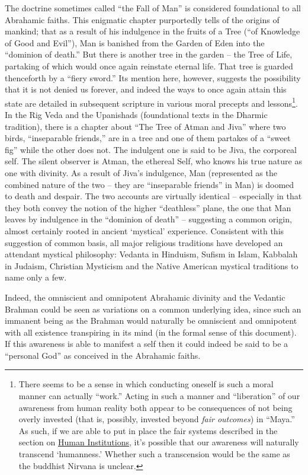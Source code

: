 \documentclass[pra,twocolumn,groupedaddress,10pt]{revtex4}
\theoremstyle{definition}
\begin{document}
The doctrine sometimes called ``the Fall of Man'' is considered foundational to all Abrahamic faiths. This enigmatic chapter purportedly tells of the origins of mankind; that as a result of his indulgence in the fruits of a Tree (``of Knowledge of Good and Evil''), Man is banished from the Garden of Eden into the ``dominion of death.''\cite{genesisfallofman} But there is another tree in the garden -- the Tree of Life, partaking of which would once again reinstate eternal life. That tree is guarded thenceforth by a ``fiery sword.'' Its mention here, however, suggests the possibility that it is not denied us forever, and indeed the ways to once again attain this state are detailed in subsequent scripture in various moral precepts and lessons\footnote{There seems to be a sense in which conducting oneself is such a moral manner can actually ``work.'' Acting in such a manner and ``liberation'' of our awareness from human reality both appear to be consequences of not being overly invested (that is, possibly, invested beyond \textit{fair outcomes}) in ``Maya.'' As such, if we are able to put in place the fair systems described in the section on \hyperref[sec:humins]{Human Institutions}, it's possible that our awareness will naturally transcend `humanness.' Whether such a transcension would be the same as the buddhist Nirvana is unclear.}. In the Rig Veda and the Upanishads (foundational texts in the Dharmic tradition), there is a chapter about ``The Tree of Atman and Jiva''\cite{mundakaupanishad} where two birds, ``inseparable friends,'' are in a tree and one of them partakes of a ``sweet fig'' while the other does not. The indulgent one is said to be Jiva, the corporeal self. The silent observer is Atman, the ethereal Self, who knows his true nature as one with divinity. As a result of Jiva's indulgence, Man (represented as the combined nature of the two -- they are ``inseparable friends'' in Man) is doomed to death and despair. The two accounts are virtually identical -- especially in that they both convey the notion of the higher ``deathless'' plane, the one that Man leaves by indulgence in the ``dominion of death'' -- suggesting a common origin, almost certainly rooted in ancient `mystical' experience. Consistent with this suggestion of common basis, all major religious traditions have developed an attendant mystical philosophy: Vedanta in Hinduism, Sufism in Islam, Kabbalah in Judaism, Christian Mysticism and the Native American mystical traditions to name only a few.

Indeed, the omniscient and omnipotent Abrahamic divinity and the Vedantic Brahman could be seen as variations on a common underlying idea, since such an immanent being as the Brahman would naturally be omniscient and omnipotent with all existence transpiring in its mind (in the formal sense of this document). If this awareness is able to manifest a self then it could indeed be said to be a ``personal God'' as conceived in the Abrahamic faiths.
\end{document}
